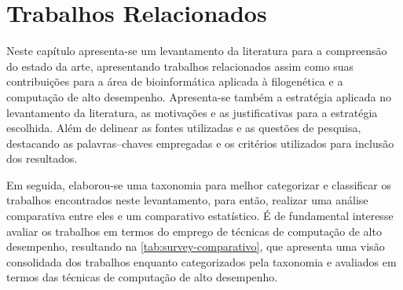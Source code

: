 \documentclass[english,brazilian]{UNISINOSmonografia} %
\begin{document}
\chapter{Trabalhos Relacionados}
\label{ch:relacionados}







Neste capítulo apresenta-se um levantamento da literatura para a compreensão do estado da arte, apresentando trabalhos relacionados assim como suas contribuições para a área de bioinformática aplicada à filogenética e a computação de alto desempenho.
%
Apresenta-se também a estratégia aplicada no levantamento da literatura, as motivações e as justificativas para a estratégia escolhida. Além de delinear as fontes utilizadas e as questões de pesquisa, destacando as palavras--chaves empregadas e os critérios utilizados para inclusão dos resultados.


Em seguida, elaborou-se uma taxonomia para melhor categorizar e classificar os trabalhos encontrados neste levantamento, para então, realizar uma análise comparativa entre eles e um comparativo estatístico. É de fundamental interesse avaliar os trabalhos em termos do emprego de técnicas de computação de alto desempenho, resultando na \autoref{tab:survey-comparativo}, que apresenta uma visão consolidada dos trabalhos enquanto categorizados pela taxonomia e avaliados em termos das técnicas de computação de alto desempenho.
\end{document}
